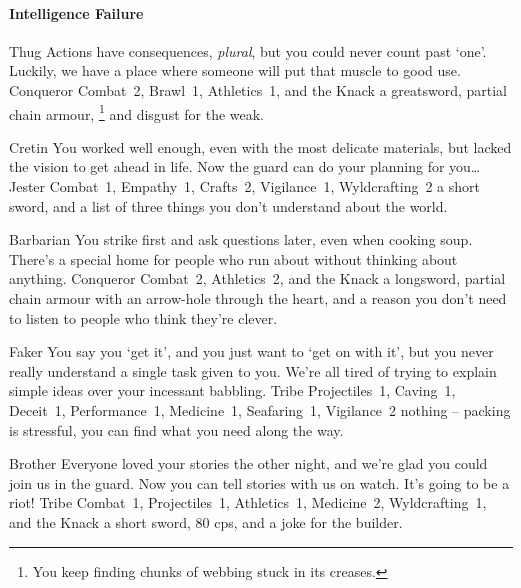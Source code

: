 \begin{multicols}{2}
\begin{itemize}
\end{itemize}

\paragraph{Intelligence Failure}

\begin{itemize}

  {Thug}%
  {Actions have consequences, \emph{plural}, but you could never count past `one'.
  Luckily, we have a place where someone will put that muscle to good use.
  }%
  {Conqueror}%
  {Combat~2, Brawl~1, Athletics~1, and the Knack \adrenalinesurge}%
  {a greatsword, partial chain armour,%
  \footnote{You keep finding chunks of webbing stuck in its creases.}
  and disgust for the weak.}%

  {Cretin}%
  {You worked well enough, even with the most delicate materials, but lacked the vision to get ahead in life.
  Now the \gls{guard} can do your planning for you\ldots
  }%
  {Jester}%
  {Combat~1, Empathy~1, Crafts~2, Vigilance~1, Wyldcrafting~2}%
  {a short sword, and a list of three things you don't understand about the world.}%


  {Barbarian}%
  {You strike first and ask questions later, even when cooking soup.
  There's a special home for people who run about without thinking about anything.
  }%
  {Conqueror}%
  {Combat~2, Athletics~2, and the Knack \laststand}%
  {a longsword, partial chain armour with an arrow-hole through the heart, and a reason you don't need to listen to people who think they're clever.}%


  {Faker}%
  {You say you `get it', and you just want to `get on with it', but you never really understand a single task given to you.
  We're all tired of trying to explain simple ideas over your incessant babbling.
  }%
  {Tribe}%
  {Projectiles~1, Caving~1, Deceit~1, Performance~1, Medicine~1, Seafaring~1, Vigilance~2}%
  {nothing -- packing is stressful, you can find what you need along the way.}%

  {Brother}%
  {Everyone loved your stories the other night, and we're glad you could join us in the \gls{guard}.
  Now you can tell stories with us on watch.
  It's going to be a riot!
  }%
  {Tribe}%
  {Combat~1, Projectiles~1, Athletics~1, Medicine~2, Wyldcrafting~1, and the Knack \guardian}%
  {a short sword, 80 \glspl{cp}, and a joke for the builder.}%


\end{itemize}
\end{multicols}
